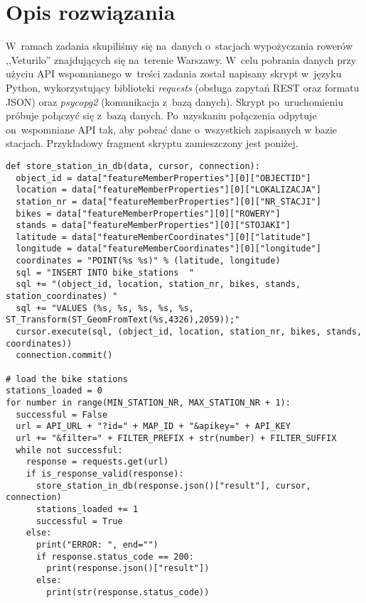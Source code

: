 \documentclass[11pt,a4paper]{article}
\begin{document}
\section{Opis rozwiązania}
W~ramach zadania skupiliśmy się na~danych o~stacjach wypożyczania rowerów ,,Veturilo'' znajdujących się na~terenie Warszawy. W~celu pobrania danych przy użyciu API wspomnianego w~treści zadania został napisany skrypt w~języku Python, wykorzystujący biblioteki \emph{requests} (obsługa zapytań REST oraz formatu JSON) oraz \emph{psycopg2} (komunikacja z~bazą danych). Skrypt po~uruchomieniu próbuje połączyć się z~bazą danych. Po~uzyskaniu połączenia odpytuje on~wspomniane API tak, aby pobrać dane o~wszystkich zapisanych w bazie stacjach. Przykładowy fragment skryptu zamieszczony jest poniżej.\\

\begin{lstlisting}[caption=Fragment skryptu służącego do pobierania danych.]
def store_station_in_db(data, cursor, connection):
  object_id = data["featureMemberProperties"][0]["OBJECTID"]
  location = data["featureMemberProperties"][0]["LOKALIZACJA"]
  station_nr = data["featureMemberProperties"][0]["NR_STACJI"]
  bikes = data["featureMemberProperties"][0]["ROWERY"]
  stands = data["featureMemberProperties"][0]["STOJAKI"]
  latitude = data["featureMemberCoordinates"][0]["latitude"]
  longitude = data["featureMemberCoordinates"][0]["longitude"]
  coordinates = "POINT(%s %s)" % (latitude, longitude)
  sql = "INSERT INTO bike_stations  "
  sql += "(object_id, location, station_nr, bikes, stands, station_coordinates) "
  sql += "VALUES (%s, %s, %s, %s, %s, ST_Transform(ST_GeomFromText(%s,4326),2059));"
  cursor.execute(sql, (object_id, location, station_nr, bikes, stands, coordinates))
  connection.commit()

# load the bike stations
stations_loaded = 0
for number in range(MIN_STATION_NR, MAX_STATION_NR + 1):
  successful = False
  url = API_URL + "?id=" + MAP_ID + "&apikey=" + API_KEY
  url += "&filter=" + FILTER_PREFIX + str(number) + FILTER_SUFFIX
  while not successful:
    response = requests.get(url)
    if is_response_valid(response):
      store_station_in_db(response.json()["result"], cursor, connection)
      stations_loaded += 1
      successful = True
    else:
      print("ERROR: ", end="")
      if response.status_code == 200:
        print(response.json()["result"])
      else:
        print(str(response.status_code))
\end{lstlisting}
\end{document}
